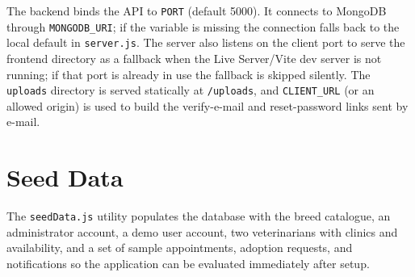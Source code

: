 The backend binds the API to \texttt{PORT} (default 5000). It connects to
MongoDB through \texttt{MONGODB\_URI}; if the variable is missing the connection
falls back to the local default in \texttt{server.js}. The server also listens
on the client port to serve the frontend directory as a fallback when the Live
Server/Vite dev server is not running; if that port is already in use the
fallback is skipped silently. The \texttt{uploads} directory is served
statically at \texttt{/uploads}, and \texttt{CLIENT\_URL} (or an allowed origin)
is used to build the verify-e-mail and reset-password links sent by e-mail.

\section*{Seed Data}

The \texttt{seedData.js} utility populates the database with the breed
catalogue, an administrator account, a demo user account, two veterinarians with
clinics and availability, and a set of sample appointments, adoption requests,
and notifications so the application can be evaluated immediately after setup.